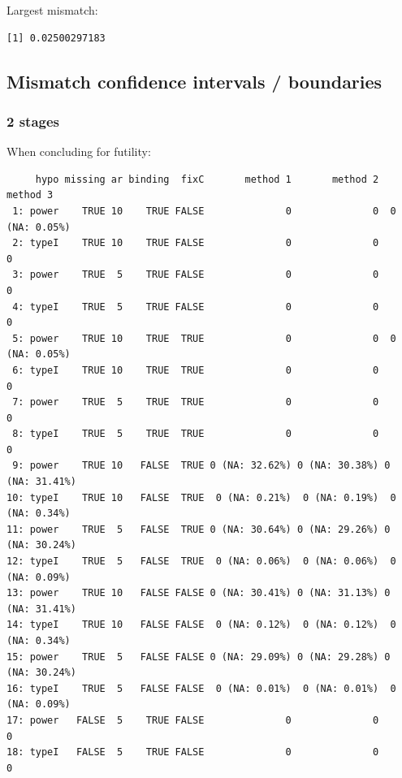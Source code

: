\documentclass[12pt]{article}
\begin{document}
Largest mismatch:
\begin{verbatim}
[1] 0.02500297183
\end{verbatim}


\clearpage

\subsection{Mismatch confidence intervals / boundaries}
\label{sec:orgd20c866}

\subsubsection{2 stages}
\label{sec:org3918c47}

When concluding for futility:
\begin{verbatim}
     hypo missing ar binding  fixC       method 1       method 2       method 3
 1: power    TRUE 10    TRUE FALSE              0              0  0 (NA: 0.05%)
 2: typeI    TRUE 10    TRUE FALSE              0              0              0
 3: power    TRUE  5    TRUE FALSE              0              0              0
 4: typeI    TRUE  5    TRUE FALSE              0              0              0
 5: power    TRUE 10    TRUE  TRUE              0              0  0 (NA: 0.05%)
 6: typeI    TRUE 10    TRUE  TRUE              0              0              0
 7: power    TRUE  5    TRUE  TRUE              0              0              0
 8: typeI    TRUE  5    TRUE  TRUE              0              0              0
 9: power    TRUE 10   FALSE  TRUE 0 (NA: 32.62%) 0 (NA: 30.38%) 0 (NA: 31.41%)
10: typeI    TRUE 10   FALSE  TRUE  0 (NA: 0.21%)  0 (NA: 0.19%)  0 (NA: 0.34%)
11: power    TRUE  5   FALSE  TRUE 0 (NA: 30.64%) 0 (NA: 29.26%) 0 (NA: 30.24%)
12: typeI    TRUE  5   FALSE  TRUE  0 (NA: 0.06%)  0 (NA: 0.06%)  0 (NA: 0.09%)
13: power    TRUE 10   FALSE FALSE 0 (NA: 30.41%) 0 (NA: 31.13%) 0 (NA: 31.41%)
14: typeI    TRUE 10   FALSE FALSE  0 (NA: 0.12%)  0 (NA: 0.12%)  0 (NA: 0.34%)
15: power    TRUE  5   FALSE FALSE 0 (NA: 29.09%) 0 (NA: 29.28%) 0 (NA: 30.24%)
16: typeI    TRUE  5   FALSE FALSE  0 (NA: 0.01%)  0 (NA: 0.01%)  0 (NA: 0.09%)
17: power   FALSE  5    TRUE FALSE              0              0              0
18: typeI   FALSE  5    TRUE FALSE              0              0              0
\end{verbatim}
\end{document}
